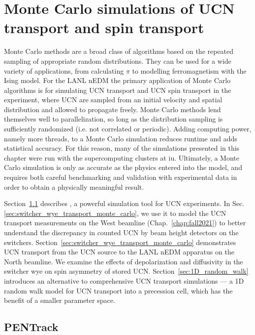 
\chapter{Monte Carlo simulations of UCN transport and spin transport}\label{chap:simulations}


Monte Carlo methods are a broad class of algorithms based on the repeated sampling of appropriate random distributions. They can be used for a wide variety of applications, from calculating $\pi$ to modelling ferromagnetism with the Ising model. For the LANL nEDM the primary application of Monte Carlo algorithms is for simulating UCN transport and UCN spin transport in the experiment, where UCN are sampled from an initial velocity and spatial distribution and allowed to propagate freely. Monte Carlo methods lend themselves well to parallelization, so long as the distribution sampling is sufficiently randomized (i.e. not correlated or periodic). Adding computing power, namely more threads, to a Monte Carlo simulation reduces runtime and adds statistical accuracy. For this reason, many of the simulations presented in this chapter were run with the supercomputing clusters at \acrshort{iu}. Ultimately, a Monte Carlo simulation is only as accurate as the physics entered into the model, and requires both careful benchmarking and validation with experimental data in order to obtain a physically meaningful result.

Section~\ref{sec:pentrack} describes \pentrack, a powerful simulation tool for UCN experiments. In Sec. \ref{sec:switcher_wye_transport_monte_carlo}, we use it to model the UCN transport measurements on the West beamline (Chap.~\ref{chap:fall2021}) to better understand the discrepancy in counted UCN by beam height detectors on the switchers. Section~\ref{sec:switcher_wye_transport_monte_carlo} demonstrates UCN transport from the UCN source to the LANL nEDM apparatus on the North beamline. We examine the effects of depolarization and diffusivity in the switcher wye on spin asymmetry of stored UCN. Section~\ref{sec:1D_random_walk} introduces an alternative to comprehensive UCN transport simulations --- a 1D random walk model for UCN transport into a precession cell, which has the benefit of a smaller parameter space.


\section{PENTrack}\label{sec:pentrack}


